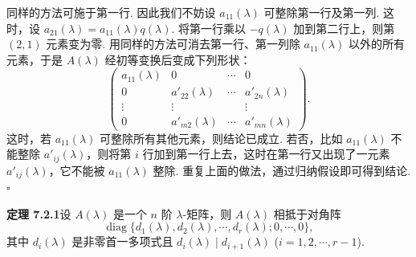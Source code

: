 \documentclass[UTF8,12pt,a4paper,fontset=fandol]{ctexart}
\begin{document}
同样的方法可施于第一行. 因此我们不妨设 $a_{11}(\lambda)$ 可整除第一行及第一列. 这时，设 $a_{21}(\lambda)=a_{11}(\lambda)q(\lambda)$. 将第一行乘以 $-q(\lambda)$ 加到第二行上，则第 $(2,1)$ 元素变为零. 用同样的方法可消去第一行、第一列除 $a_{11}(\lambda)$ 以外的所有元素，于是 $A(\lambda)$ 经初等变换后变成下列形状：
\begin{equation}
\left(\begin{array}{cccc}
a_{11}(\lambda) & 0 & \cdots & 0\\
0 & a'_{22}(\lambda) & \cdots & a'_{2n}(\lambda)\\
\vdots & \vdots & & \vdots\\
0 & a'_{m2}(\lambda) & \cdots & a'_{mn}(\lambda)
\end{array}\right).
\tag{7.2.1}
\end{equation}
这时，若 $a_{11}(\lambda)$ 可整除所有其他元素，则结论已成立. 若否，比如 $a_{11}(\lambda)$ 不能整除 $a'_{ij}(\lambda)$，则将第 $i$ 行加到第一行上去，这时在第一行又出现了一元素 $a'_{ij}(\lambda)$，它不能被 $a_{11}(\lambda)$ 整除. 重复上面的做法，通过归纳假设即可得到结论. $\square$

\noindent\textbf{定理 7.2.1}\quad 设 $A(\lambda)$ 是一个 $n$ 阶 $\lambda$-矩阵，则 $A(\lambda)$ 相抵于对角阵
\begin{equation}
\operatorname{diag}\{d_1(\lambda),d_2(\lambda),\cdots,d_r(\lambda);0,\cdots,0\},
\tag{7.2.2}
\end{equation}
其中 $d_i(\lambda)$ 是非零首一多项式且 $d_i(\lambda)\mid d_{i+1}(\lambda)$ ($i=1,2,\cdots,r-1$).
\end{document}
